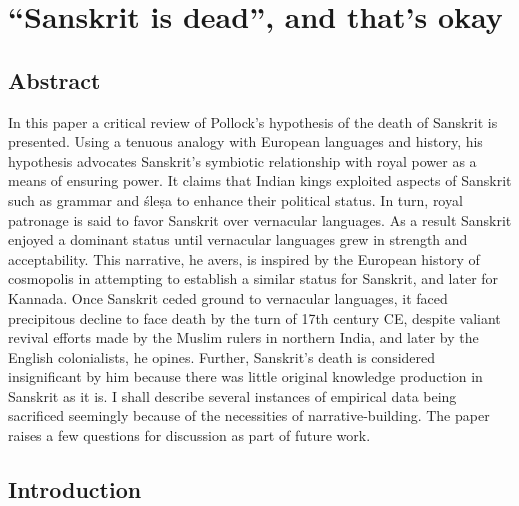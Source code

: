 \chapter{``Sanskrit is dead'', and that’s okay}\label{chapter4}

\section*{Abstract}

In this paper a critical review of Pollock’s hypothesis of the death of Sanskrit is presented. Using a tenuous analogy with European languages and history, his hypothesis advocates Sanskrit’s symbiotic relationship with royal power as a means of ensuring power. It claims that Indian kings exploited aspects of Sanskrit such as grammar and śleṣa to enhance their political status. In turn, royal patronage is said to favor Sanskrit over vernacular languages. As a result Sanskrit enjoyed a dominant status until vernacular languages grew in strength and acceptability. This narrative, he avers, is inspired by the European history of cosmopolis in attempting to establish a similar status for Sanskrit, and later for Kannada. Once Sanskrit ceded ground to vernacular languages, it faced precipitous decline to face death by the turn of 17th century CE, despite valiant revival efforts made by the Muslim rulers in northern India, and later by the English colonialists, he opines. Further, Sanskrit’s death is considered insignificant by him because there was little original knowledge production in Sanskrit as it is. I shall describe several instances of empirical data being sacrificed seemingly because of the necessities of narrative-building. The paper raises a few questions for discussion as part of future work.

\section*{Introduction}

